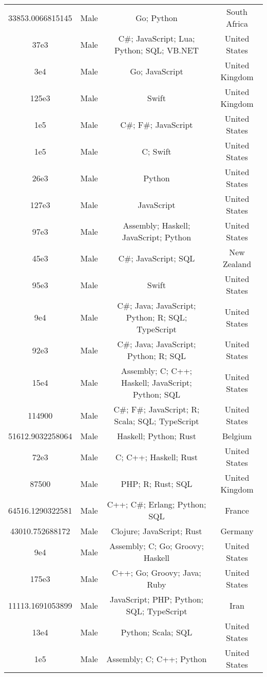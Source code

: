 \begin{center}
\begin{tabular}{ |c|c|c|c| }
33853.0066815145  &  Male  &  Go; Python  &  South Africa  \\ 
37e3  &  Male  &  C\#; JavaScript; Lua; Python; SQL; VB.NET  &  United States  \\ 
3e4  &  Male  &  Go; JavaScript  &  United Kingdom  \\ 
125e3  &  Male  &  Swift  &  United Kingdom  \\ 
1e5  &  Male  &  C\#; F\#; JavaScript  &  United States  \\ 
1e5  &  Male  &  C; Swift  &  United States  \\ 
26e3  &  Male  &  Python  &  United States  \\ 
127e3  &  Male  &  JavaScript  &  United States  \\ 
97e3  &  Male  &  Assembly; Haskell; JavaScript; Python  &  United States  \\ 
45e3  &  Male  &  C\#; JavaScript; SQL  &  New Zealand  \\ 
95e3  &  Male  &  Swift  &  United States  \\ 
9e4  &  Male  &  C\#; Java; JavaScript; Python; R; SQL; TypeScript  &  United States  \\ 
92e3  &  Male  &  C\#; Java; JavaScript; Python; R; SQL  &  United States  \\ 
15e4  &  Male  &  Assembly; C; C++; Haskell; JavaScript; Python; SQL  &  United States  \\ 
114900  &  Male  &  C\#; F\#; JavaScript; R; Scala; SQL; TypeScript  &  United States  \\ 
51612.9032258064  &  Male  &  Haskell; Python; Rust  &  Belgium  \\ 
72e3  &  Male  &  C; C++; Haskell; Rust  &  United States  \\ 
87500  &  Male  &  PHP; R; Rust; SQL  &  United Kingdom  \\ 
64516.1290322581  &  Male  &  C++; C\#; Erlang; Python; SQL  &  France  \\ 
43010.752688172  &  Male  &  Clojure; JavaScript; Rust  &  Germany  \\ 
9e4  &  Male  &  Assembly; C; Go; Groovy; Haskell  &  United States  \\ 
175e3  &  Male  &  C++; Go; Groovy; Java; Ruby  &  United States  \\ 
11113.1691053899  &  Male  &  JavaScript; PHP; Python; SQL; TypeScript  &  Iran  \\ 
13e4  &  Male  &  Python; Scala; SQL  &  United States  \\ 
1e5  &  Male  &  Assembly; C; C++; Python  &  United States  \\ 

\end{tabular}
\end{center}
